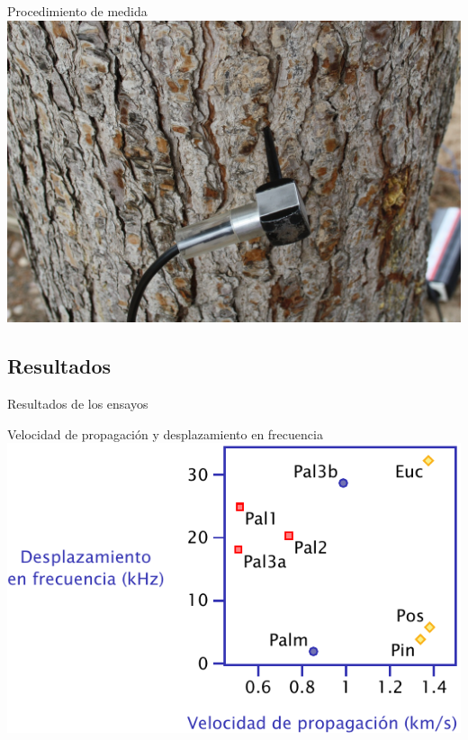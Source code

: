 \documentclass[utf8, compress]			{beamer}
\begin{document}
\begin{frame}{Procedimiento de medida}
    \hspace{1.5em}
    \includegraphics{mpino.jpg}
\end{frame}


\subsection{Resultados}

\begin{frame}{Resultados de los ensayos}
    \tableofcontents[currentsubsection]
\end{frame}

\begin{frame}{Velocidad de propagación y desplazamiento en frecuencia}
    \includegraphics{resultados.pdf}
\end{frame}
\end{document}
